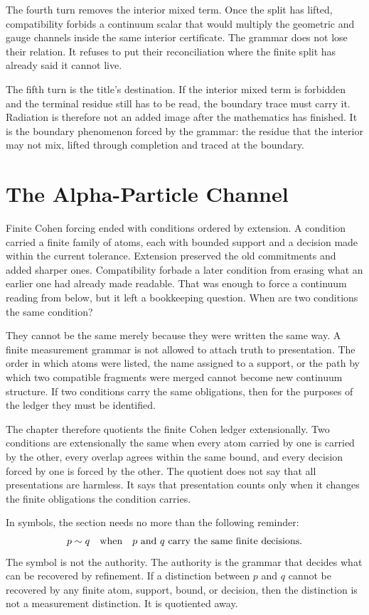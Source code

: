 The fourth turn removes the interior mixed term. Once the split has lifted,
compatibility forbids a continuum scalar that would multiply the geometric and
gauge channels inside the same interior certificate. The grammar does not lose
their relation. It refuses to put their reconciliation where the finite split
has already said it cannot live.

The fifth turn is the title's destination. If the interior mixed term is
forbidden and the terminal residue still has to be read, the boundary trace
must carry it. Radiation is therefore not an added image after the mathematics
has finished. It is the boundary phenomenon forced by the grammar: the residue
that the interior may not mix, lifted through completion and traced at the
boundary.

\section{The Alpha-Particle Channel}

Finite Cohen forcing ended with conditions ordered by extension. A condition
carried a finite family of atoms, each with bounded support and a decision
made within the current tolerance. Extension preserved the old commitments and
added sharper ones. Compatibility forbade a later condition from erasing what
an earlier one had already made readable. That was enough to force a continuum
reading from below, but it left a bookkeeping question. When are two
conditions the same condition?

They cannot be the same merely because they were written the same way. A
finite measurement grammar is not allowed to attach truth to presentation.
The order in which atoms were listed, the name assigned to a support, or the
path by which two compatible fragments were merged cannot become new
continuum structure. If two conditions carry the same obligations, then for
the purposes of the ledger they must be identified.

The chapter therefore quotients the finite Cohen ledger extensionally. Two
conditions are extensionally the same when every atom carried by one is
carried by the other, every overlap agrees within the same bound, and every
decision forced by one is forced by the other. The quotient does not say that
all presentations are harmless. It says that presentation counts only when it
changes the finite obligations the condition carries.

In symbols, the section needs no more than the following reminder:
\[
  p \sim q
  \quad\hbox{when}\quad
  p\hbox{ and }q\hbox{ carry the same finite decisions.}
\]
The symbol is not the authority. The authority is the grammar that decides
what can be recovered by refinement. If a distinction between \(p\) and \(q\)
cannot be recovered by any finite atom, support, bound, or decision, then the
distinction is not a measurement distinction. It is quotiented away.

